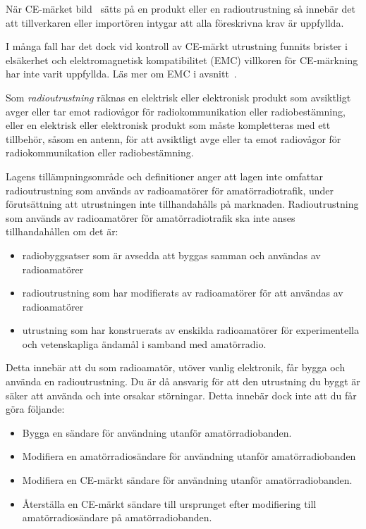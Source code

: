 När CE-märket bild~ sätts på en produkt eller en
radioutrustning så innebär det att tillverkaren eller importören intygar att
alla föreskrivna krav är uppfyllda.

I många fall har det dock vid kontroll av CE-märkt utrustning funnits brister
i elsäkerhet och elektromagnetisk kompatibilitet (EMC) villkoren för CE-märkning
har inte varit uppfyllda. Läs mer om EMC i avsnitt~.

Som \emph{radioutrustning} räknas en elektrisk eller elektronisk produkt som
avsiktligt avger eller tar emot radiovågor för radiokommunikation eller
radiobestämning, eller en elektrisk eller elektronisk produkt som måste
kompletteras med ett tillbehör, såsom en antenn, för att avsiktligt avge
eller ta emot radiovågor för radiokommunikation eller radiobestämning.

Lagens tillämpningsområde och definitioner anger att lagen inte omfattar
radioutrustning som används av radioamatörer för amatörradiotrafik, under
förutsättning att utrustningen inte tillhandahålls på marknaden.
Radioutrustning som används av radioamatörer för amatörradiotrafik ska inte
anses tillhandahållen om det är:

\begin{itemize}
	\item radiobyggsatser som är avsedda att byggas samman och användas av
	radioamatörer
	\item radioutrustning som har modifierats av radioamatörer för att
	användas av radioamatörer
	\item utrustning som har konstruerats av enskilda radioamatörer för
	experimentella och vetenskapliga ändamål i samband med amatörradio.
\end{itemize}

Detta innebär att du som radioamatör, utöver vanlig elektronik, får bygga
och använda en radioutrustning.
Du är då ansvarig för att den utrustning du byggt är säker att använda och inte
orsakar störningar.
Detta innebär dock inte att du får göra följande:

\begin{itemize}
	\item Bygga en sändare för användning utanför amatörradiobanden.
	\item Modifiera en amatörradiosändare för användning utanför amatörradiobanden
	\item Modifiera en CE-märkt sändare för användning utanför amatörradiobanden.
	\item Återställa en CE-märkt sändare till ursprunget efter modifiering till
	amatörradiosändare på amatörradiobanden.
\end{itemize}

